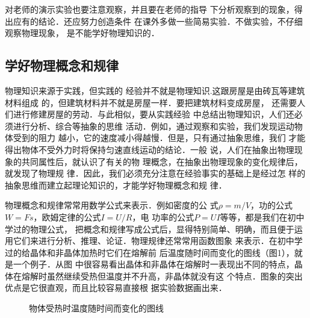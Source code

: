     对老师的演示实验也要注意观察，并且要在老师的指导
下分析观察到的现象，得出应有的结论．还应努力创造条件
在课外多做一些简易实验．不做实验，不仔细观察物理现象，
是不能学好物理知识的．

    \subsection*{学好物理概念和规律}

物理知识来源于实践，但实践的
经验并不就是物理知识.这跟房屋是由砖瓦等建筑材料组成
的，但建筑材料并不就是房屋一样．要把建筑材料变成房屋，
还需要人们进行修建房屋的劳动．与此相似，要从实践经验
中总结出物理知识，人们还必须进行分析、综合等抽象的思维
活动．例如，通过观察和实验，我们发现运动物体受到的阻力
越小，它的速度减小得越慢．但是，只有通过抽象思维，我们
才能得出物体不受外力时将保持匀速直线运动的结论．一般
说，人们在抽象出物理现象的共同属性后，就认识了有关的物
理概念，在抽象出物理现象的变化规律后，就发现了物理规
律．因此，我们必须充分注意在经验事实的基础上是经过怎
样的抽象思维而建立起理论知识的，才能学好物理概念和规
律．

物理概念和规律常常用数学公式来表示．例如密度的公
式$\rho=m/V$，功的公式$W=Fs$，欧姆定律的公式$I=U/R$，电
功率的公式$P=UI$等等，都是我们在初中学过的物理公式，
把概念和规律写成公式后，显得特别简单、明确，而且便于运
用它们来进行分析、推理、论证．物理规律还常常用函数图象
来表示．在初中学过的给晶体和非晶体加热时它们在熔解前
后温度随时间而变化的图线（图1），就是一个例子．从图
中很容易看出晶体和非晶体在熔解时一表现出不同的特点，晶
体在熔解时虽然继续受热但温度并不升高，非晶体就没有这
个特点．图象的突出优点是它很直观，而且比较容易直接根
据实验数据画出来．

\begin{figure}[htp]\centering 
{}\qquad\qquad 
{}
\caption{物体受热时温度随时间而变化的图线
}
\end{figure}

